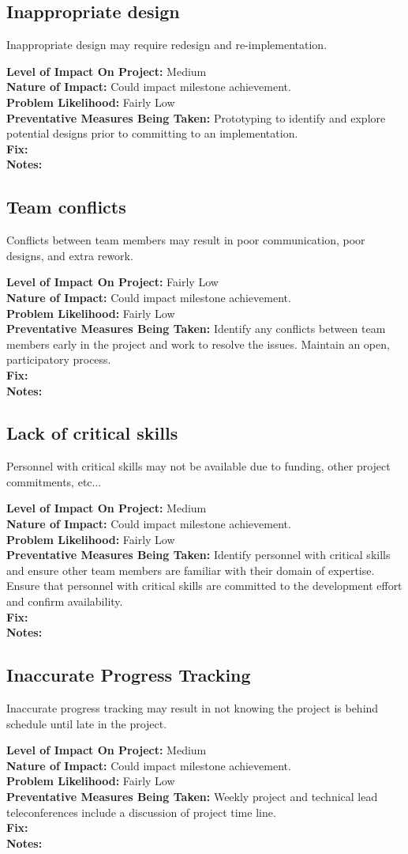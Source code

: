 \documentclass[english]{article}
\newcommand{\sreq}[1]{\subsection{\hspace{.2in}#1}}
\newenvironment
{reqlist}
{\begin{list} {} {} \rm \item[]}
{\end{list}}
\begin{document}
\sreq{Inappropriate design}
Inappropriate design may require redesign and re-implementation.
\begin{reqlist}
{\bf Level of Impact On Project:} Medium \\
{\bf Nature of Impact:} Could impact milestone achievement.\\
{\bf Problem Likelihood:} Fairly Low \\
{\bf Preventative Measures Being Taken:}
Prototyping to identify and explore potential designs prior to committing to
an implementation.
\\
{\bf Fix:}\\
{\bf Notes:} 
\end{reqlist}

\sreq{Team conflicts}
Conflicts between team members may result in poor communication, poor designs,
and extra rework.
\begin{reqlist}
{\bf Level of Impact On Project:} Fairly Low \\
{\bf Nature of Impact:} Could impact milestone achievement.\\
{\bf Problem Likelihood:} Fairly Low \\
{\bf Preventative Measures Being Taken:}
Identify any conflicts between team members early in the project and work to
resolve the issues. Maintain an open, participatory process.
\\
{\bf Fix:}\\
{\bf Notes:} 
\end{reqlist}

\sreq{Lack of critical skills}
Personnel with critical skills may not be available due to funding, other
project commitments, etc...
\begin{reqlist}
{\bf Level of Impact On Project:} Medium \\
{\bf Nature of Impact:} Could impact milestone achievement.\\
{\bf Problem Likelihood:} Fairly Low \\
{\bf Preventative Measures Being Taken:}
Identify personnel with critical skills and ensure other team
members are familiar with their domain of expertise.
Ensure that personnel with critical skills are committed
to the development effort and confirm availability.
\\
{\bf Fix:}\\
{\bf Notes:} 
\end{reqlist}

\sreq{Inaccurate Progress Tracking}
Inaccurate progress tracking may result in not knowing the project is
behind schedule until late in the project.
\begin{reqlist}
{\bf Level of Impact On Project:} Medium \\
{\bf Nature of Impact:} Could impact milestone achievement.\\
{\bf Problem Likelihood:} Fairly Low \\
{\bf Preventative Measures Being Taken:}
Weekly project and technical lead teleconferences
include a discussion of project time line.
\\
{\bf Fix:}\\
{\bf Notes:} 
\end{reqlist}
\end{document}
